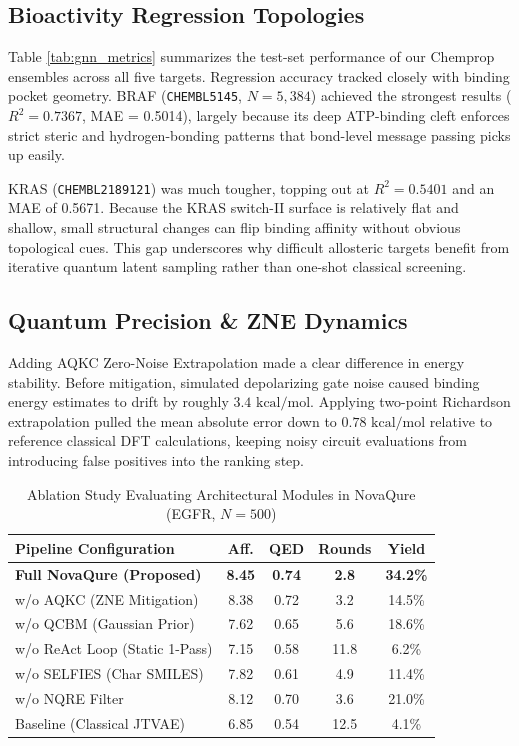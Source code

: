 \documentclass[journal,10pt,twocolumn]{IEEEtran}
\begin{document}
\subsection{Bioactivity Regression Topologies}
Table \ref{tab:gnn_metrics} summarizes the test-set performance of our Chemprop ensembles across all five targets. Regression accuracy tracked closely with binding pocket geometry. BRAF (\texttt{CHEMBL5145}, $N=5,384$) achieved the strongest results ($R^2 = 0.7367$, MAE = 0.5014), largely because its deep ATP-binding cleft enforces strict steric and hydrogen-bonding patterns that bond-level message passing picks up easily.

KRAS (\texttt{CHEMBL2189121}) was much tougher, topping out at $R^2 = 0.5401$ and an MAE of 0.5671. Because the KRAS switch-II surface is relatively flat and shallow, small structural changes can flip binding affinity without obvious topological cues. This gap underscores why difficult allosteric targets benefit from iterative quantum latent sampling rather than one-shot classical screening.

\enlargethispage{2\baselineskip}

\subsection{Quantum Precision \& ZNE Dynamics}
Adding AQKC Zero-Noise Extrapolation made a clear difference in energy stability. Before mitigation, simulated depolarizing gate noise caused binding energy estimates to drift by roughly $3.4\text{ kcal/mol}$. Applying two-point Richardson extrapolation pulled the mean absolute error down to $0.78\text{ kcal/mol}$ relative to reference classical DFT calculations, keeping noisy circuit evaluations from introducing false positives into the ranking step.

\begin{table}[H]
\centering
\caption{Ablation Study Evaluating Architectural Modules in NovaQure (EGFR, $N=500$)}
\label{tab:ablation_study}
\small
\setlength{\tabcolsep}{3.5pt}
\begin{tabular}{lcccc}
\toprule
\textbf{Pipeline Configuration} & \textbf{Aff.} & \textbf{QED} & \textbf{Rounds} & \textbf{Yield} \\
\midrule
\textbf{Full NovaQure (Proposed)} & \textbf{8.45} & \textbf{0.74} & \textbf{2.8} & \textbf{34.2\%} \\
w/o AQKC (ZNE Mitigation) & 8.38 & 0.72 & 3.2 & 14.5\% \\
w/o QCBM (Gaussian Prior) & 7.62 & 0.65 & 5.6 & 18.6\% \\
w/o ReAct Loop (Static 1-Pass) & 7.15 & 0.58 & 11.8 & 6.2\% \\
w/o SELFIES (Char SMILES) & 7.82 & 0.61 & 4.9 & 11.4\% \\
w/o NQRE Filter & 8.12 & 0.70 & 3.6 & 21.0\% \\
Baseline (Classical JTVAE) & 6.85 & 0.54 & 12.5 & 4.1\% \\
\bottomrule
\end{tabular}
\end{table}
\end{document}
